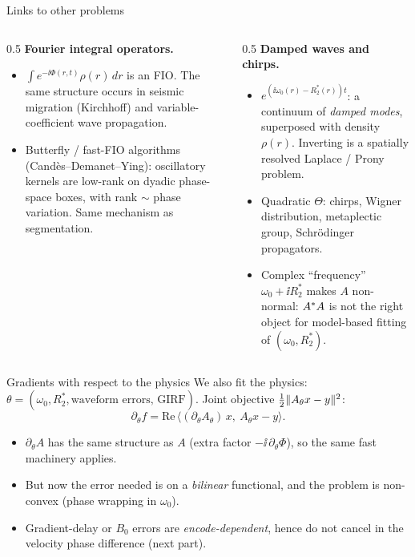 \iflong
\begin{frame}{Links to other problems}
\begin{columns}[T]
\begin{column}{0.5\textwidth}
\textbf{Fourier integral operators.}
\begin{itemize}
\item $\int e^{-\ii\Phi(r,t)}\rho(r)\,dr$ is an FIO. The same structure occurs in seismic migration (Kirchhoff) and variable-coefficient wave propagation.
\item Butterfly / fast-FIO algorithms (Cand\`es--Demanet--Ying): oscillatory kernels are low-rank on dyadic phase-space boxes, with rank $\sim$ phase variation. Same mechanism as segmentation.
\end{itemize}
\end{column}
\begin{column}{0.5\textwidth}
\textbf{Damped waves and chirps.}
\begin{itemize}
\item $e^{(\ii\omega_0(r)-R_2^*(r))t}$: a continuum of \emph{damped modes}, superposed with density $\rho(r)$. Inverting is a spatially resolved Laplace / Prony problem.
\item Quadratic $\Theta$: chirps, Wigner distribution, metaplectic group, Schr\"odinger propagators.
\item Complex ``frequency'' $\omega_0+\ii R_2^*$ makes $A$ non-normal: $A^{*} A$ is not the right object for model-based fitting of $(\omega_0,R_2^*)$.
\end{itemize}
\end{column}
\end{columns}
\end{frame}

\begin{frame}{Gradients with respect to the physics}
We also fit the physics: $\theta=(\omega_0,R_2^*,\text{waveform errors, GIRF})$. Joint objective $\tfrac12\lVert A_\theta x-y\rVert^2$:
\[ \partial_\theta f=\mathrm{Re}\,\big\langle (\partial_\theta A_\theta)\,x,\ A_\theta x-y\big\rangle . \]
\begin{itemize}
\item $\partial_\theta A$ has the same structure as $A$ (extra factor $-\ii\,\partial_\theta\Phi$), so the same fast machinery applies.
\item But now the error needed is on a \emph{bilinear} functional, and the problem is non-convex (phase wrapping in $\omega_0$).
\item Gradient-delay or $B_0$ errors are \emph{encode-dependent}, hence do not cancel in the velocity phase difference (next part).
\end{itemize}
\end{frame}
\fi
